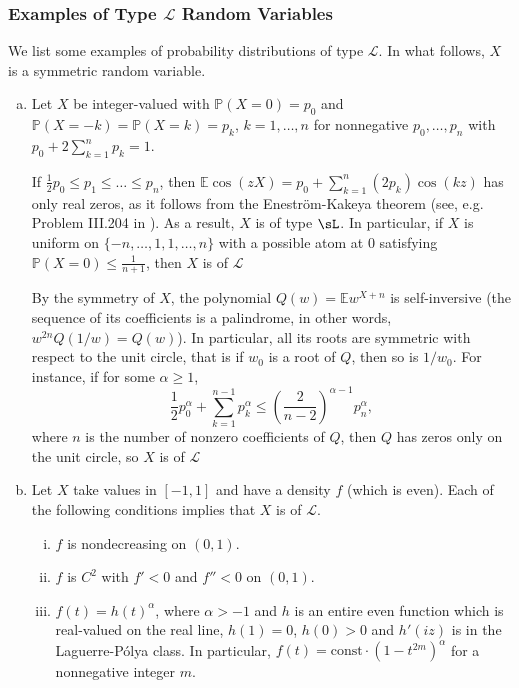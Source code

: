 \documentclass[10pt]{article}
\newcommand{\E}{\mathbb{E}}
\newcommand{\1}{\textbf{1}}
\newcommand{\p}[1]{\mathbb{P}\left( #1 \right)}
\theoremstyle{remark}
\theoremstyle{definition}
\begin{document}
\subsubsection{Examples of Type $\mathcal{L}$ Random Variables}

We list some examples of probability distributions of type $\mathcal{L}$. In what follows, $X$ is a symmetric random variable.

\begin{enumerate}[(a)]

\item 
Let $X$ be integer-valued with $\p{X = 0} = p_0$ and $\p{X = -k} = \p{X = k} = p_k$, $k = 1, \dots, n$ for nonnegative $p_0, \dots, p_n$ with $p_0 + 2\sum_{k=1}^n p_k = 1$. 

If $\frac{1}{2}p_0 \leq p_1 \leq \dots \leq p_n$, then $\E \cos(zX) = p_0 + \sum_{k=1}^n (2p_k)\cos(kz)$ has only real zeros, as it follows from the Enestr\"om-Kakeya theorem (see, e.g. Problem III.204 in \cite{PS1}). As a result, $X$ is of type $\sL$. In particular, if $X$ is uniform on $\{-n,\dots, 1, 1, \dots, n\}$ with a possible atom at $0$ satisfying $\p{X = 0} \leq \frac{1}{n+1}$, then $X$ is of $\mathcal{L}$

By the symmetry of $X$, the polynomial $Q(w) = \E w^{X+n}$ is self-inversive (the sequence of its coefficients is a palindrome, in other words, $w^{2n}Q(1/w) = Q(w)$). In particular, all its roots are symmetric with respect to the unit circle, that is if $w_0$ is a root of $Q$, then so is $1/w_0$. For instance, if for some $\alpha \geq 1$,
\[
\frac{1}{2}p_0^\alpha + \sum_{k=1}^{n-1} p_k^\alpha \leq \left(\frac{2}{n-2}\right)^{\alpha-1}p_n^\alpha,
\]
where $n$ is the number of nonzero coefficients of $Q$, then $Q$ has zeros only on the unit circle, so $X$ is of $\mathcal{L}$

\item
Let $X$ take values in $[-1,1]$ and have a density $f$ (which is even). Each of the following conditions implies that $X$ is of $\mathcal{L}$.
\begin{enumerate}[(i)]
\item $f$ is  nondecreasing on $(0,1)$.

\item $f$ is $C^2$ with $f' < 0$ and $f'' < 0$ on $(0,1)$.

\item $f(t) = h(t)^{\alpha}$, where $\alpha > -1$ and $h$ is an entire even function which is real-valued on the real line, $h(1) = 0$, $h(0) > 0$ and $h'(iz)$ is  in the Laguerre-P\'olya class. In particular, $f(t) = \text{const}\cdot (1-t^{2m})^{\alpha}$ for a nonnegative integer $m$.  
\end{enumerate}


\end{enumerate}
\end{document}
